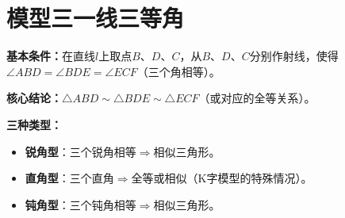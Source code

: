 \documentclass[12pt, a4paper]{ctexart}
\begin{document}
\newpage
\section*{\textcolor{modelteal}{模型三\quad 一线三等角}}

\begin{modelbox}
\textbf{基本条件：}在直线$l$上取点$B$、$D$、$C$，从$B$、$D$、$C$分别作射线，使得$\angle ABD = \angle BDE = \angle ECF$（三个角相等）。

\textbf{核心结论：}$\triangle ABD \sim \triangle BDE \sim \triangle ECF$（或对应的全等关系）。

\textbf{三种类型：}
\begin{itemize}
  \item \textbf{锐角型}：三个锐角相等$\Longrightarrow$相似三角形。
  \item \textbf{直角型}：三个直角$\Longrightarrow$全等或相似（K字模型的特殊情况）。
  \item \textbf{钝角型}：三个钝角相等$\Longrightarrow$相似三角形。
\end{itemize}
\end{modelbox}
\end{document}
